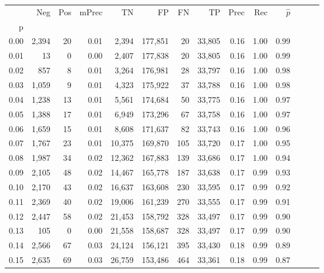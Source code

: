 \begin{tabular}{rrrrrrrrrrrrrr}
\toprule
{} &    Neg &  Pos & mPrec &       TN &       FP &      FN &      TP &  Prec &   Rec & $\hat{p}$ \\
p    &        &      &       &          &          &         &         &       &       &           \\
\midrule
0.00 &  2,394 &   20 &  0.01 &    2,394 &  177,851 &      20 &  33,805 &  0.16 &  1.00 &      0.99 \\
0.01 &     13 &    0 &  0.00 &    2,407 &  177,838 &      20 &  33,805 &  0.16 &  1.00 &      0.99 \\
0.02 &    857 &    8 &  0.01 &    3,264 &  176,981 &      28 &  33,797 &  0.16 &  1.00 &      0.98 \\
0.03 &  1,059 &    9 &  0.01 &    4,323 &  175,922 &      37 &  33,788 &  0.16 &  1.00 &      0.98 \\
0.04 &  1,238 &   13 &  0.01 &    5,561 &  174,684 &      50 &  33,775 &  0.16 &  1.00 &      0.97 \\
0.05 &  1,388 &   17 &  0.01 &    6,949 &  173,296 &      67 &  33,758 &  0.16 &  1.00 &      0.97 \\
0.06 &  1,659 &   15 &  0.01 &    8,608 &  171,637 &      82 &  33,743 &  0.16 &  1.00 &      0.96 \\
0.07 &  1,767 &   23 &  0.01 &   10,375 &  169,870 &     105 &  33,720 &  0.17 &  1.00 &      0.95 \\
0.08 &  1,987 &   34 &  0.02 &   12,362 &  167,883 &     139 &  33,686 &  0.17 &  1.00 &      0.94 \\
0.09 &  2,105 &   48 &  0.02 &   14,467 &  165,778 &     187 &  33,638 &  0.17 &  0.99 &      0.93 \\
0.10 &  2,170 &   43 &  0.02 &   16,637 &  163,608 &     230 &  33,595 &  0.17 &  0.99 &      0.92 \\
0.11 &  2,369 &   40 &  0.02 &   19,006 &  161,239 &     270 &  33,555 &  0.17 &  0.99 &      0.91 \\
0.12 &  2,447 &   58 &  0.02 &   21,453 &  158,792 &     328 &  33,497 &  0.17 &  0.99 &      0.90 \\
0.13 &    105 &    0 &  0.00 &   21,558 &  158,687 &     328 &  33,497 &  0.17 &  0.99 &      0.90 \\
0.14 &  2,566 &   67 &  0.03 &   24,124 &  156,121 &     395 &  33,430 &  0.18 &  0.99 &      0.89 \\
0.15 &  2,635 &   69 &  0.03 &   26,759 &  153,486 &     464 &  33,361 &  0.18 &  0.99 &      0.87 \\

\end{tabular}
